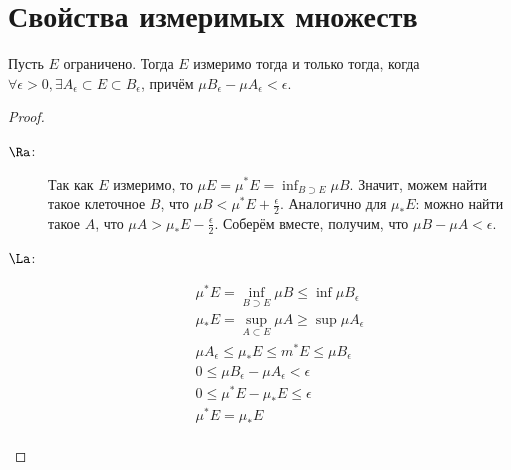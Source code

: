 \section{Свойства измеримых множеств}
\begin{theorem}
	Пусть $E$ ограничено.
	Тогда $E$ измеримо тогда и только тогда, когда $\forall \epsilon > 0, \exists A_\epsilon \subset E \subset B_\epsilon$, причём
	$\mu B_\epsilon - \mu A_\epsilon < \epsilon$.
\end{theorem}
\begin{proof}
	\begin{description}
	\item[$\Ra$:]
		Так как $E$ измеримо, то $\mu E = \mu^* E = \inf_{B \supset E} \mu B$.
		Значит, можем найти такое клеточное $B$, что $\mu B < \mu^*E + \frac{\epsilon}2$.
		Аналогично для $\mu_* E$: можно найти такое $A$, что $\mu A > \mu_*E - \frac{\epsilon}2$.
		Соберём вместе, получим, что $\mu B - \mu A < \epsilon$.
	\item[$\La$:]
		\begin{gather*}
			\mu^*E = \inf_{B\supset E} \mu B \le \inf \mu B_\epsilon \\
			\mu_*E = \sup_{A\subset E} \mu A \ge \sup \mu A_\epsilon \\
			\mu A_\epsilon \le \mu_*E \le m^* E \le \mu B_\epsilon \\
			0 \le \mu B_\epsilon - \mu A_\epsilon < \epsilon \\
			0 \le \mu^* E - \mu_* E \le \epsilon \\
			\mu^* E = \mu_* E \\
		\end{gather*}
	\end{description}
\end{proof}
